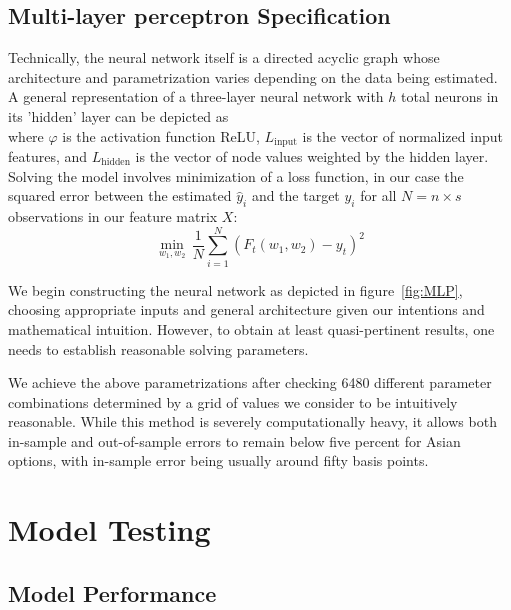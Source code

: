 \documentclass[11pt]{article}
\begin{document}
	\subsection{Multi-layer perceptron Specification}
		Technically, the neural network itself is a directed acyclic graph whose architecture and parametrization varies depending on the data being estimated. A general representation of a three-layer neural network with $h$ total neurons in its 'hidden' layer can be depicted as \\
		
		\noindent
		where $\varphi$ is the activation function ReLU, $L_{\text{input}}$ is the vector of normalized input features, and $L_{\text{hidden}}$ is the vector of node values weighted by the hidden layer. Solving the model involves minimization of a loss function, in our case the squared error between the estimated $\hat{y}_{i}$ and the target $y_{i}$ for all $N = n \times s$ observations in our feature matrix $X$:
		\begin{equation}
			\min_{w_{1}, w_{2}} \, \frac{1}{N} \sum_{i=1}^{N} \left(F_{t}(w_{1}, w_{2}) - y_{t}\right)^{2}
		\end{equation}
		\par
		We begin constructing the neural network as depicted in figure~\ref{fig:MLP}, choosing appropriate inputs and general architecture given our intentions and mathematical intuition. However, to obtain at least quasi-pertinent results, one needs to establish reasonable solving parameters.
		\vspace{0.5em}
	
		
		\par
		We achieve the above parametrizations after checking 6480 different parameter combinations determined by a grid of values we consider to be intuitively reasonable. While this method is severely computationally heavy, it allows both in-sample and out-of-sample errors to remain below five percent for Asian options, with in-sample error being usually around fifty basis points.
	
\section{Model Testing}
	\subsection{Model Performance}
	
\end{document}
